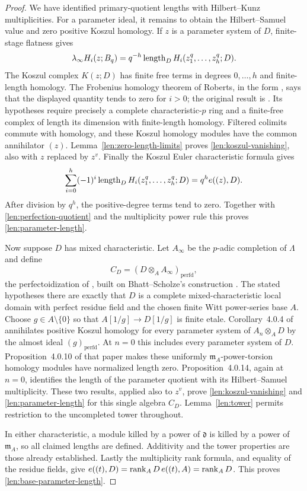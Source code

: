 \begin{proof}
We have identified primary-quotient lengths with Hilbert--Kunz
multiplicities.  For a parameter ideal, it remains to obtain the
Hilbert--Samuel value and zero positive Koszul homology.  If $z$ is
a parameter system of $D$, finite-stage flatness gives
\[
 \lambda_\infty H_i(z;B_q)
          =q^{-h}\operatorname{length}_D H_i(z_1^q,\ldots,z_h^q;D).
\]
The Koszul complex $K(z;D)$ has finite free terms in degrees
$0,\ldots,h$ and finite-length homology.  The Frobenius homology
theorem of Roberts, in the form \cite[Theorem~2.4]{Ma}, says that
the displayed quantity tends to zero for $i>0$; the original result
is \cite{RobertsIntersectionTheorems}. Its hypotheses
require precisely a complete characteristic-$p$ ring and a
finite-free complex of length its dimension with finite-length
homology.  Filtered colimits commute with homology, and these
Koszul homology modules have the common annihilator $(z)$.
Lemma~\ref{len:zero-length-limits} proves
\eqref{len:koszul-vanishing}, also with $z$ replaced by $z^v$.
Finally the Koszul Euler characteristic formula gives
\[
 \sum_{i=0}^h(-1)^i\operatorname{length}_D H_i(z_1^q,\ldots,z_h^q;D)
                           =q^h e((z),D).
\]
After division by $q^h$, the positive-degree terms tend to zero.
Together with \eqref{len:perfection-quotient} and the multiplicity
power rule this proves \eqref{len:parameter-length}.

Now suppose $D$ has mixed characteristic.  Let $A_\infty$ be the
$p$-adic completion of $\Lambda$ and define
\[
 C_D=(D\otimes_A A_\infty)_{\mathrm{perfd}},
\]
the perfectoidization of \cite[Notation~4.0.1]{CLMST}, built on
Bhatt--Scholze's construction \cite[Proposition~8.5]{BhattScholze}.
The stated hypotheses there are exactly that $D$ is a complete
mixed-characteristic local domain with perfect residue field and
the chosen finite Witt power-series base $A$.
Choose $g\in A\setminus\{0\}$ so that $A[1/g]\to D[1/g]$ is
finite etale.  Corollary~4.0.4 of \cite{CLMST} annihilates positive
Koszul homology for every parameter system of $A_n\otimes_A D$
by the almost ideal $(g)_{\mathrm{perfd}}$.
At $n=0$ this includes every parameter system of $D$.
Proposition~4.0.10 of that paper makes these uniformly
$\mathfrak m_A$-power-torsion homology modules have normalized
length zero.  Proposition~4.0.14, again at $n=0$, identifies the
length of the parameter quotient with its Hilbert--Samuel
multiplicity.  These two results, applied also to $z^v$, prove
\eqref{len:koszul-vanishing} and \eqref{len:parameter-length}
for this single algebra $C_D$.  Lemma~\ref{len:tower} permits
restriction to the uncompleted tower throughout.

In either characteristic, a module killed by a power of
$\mathfrak d$ is killed by a power of $\mathfrak m_A$, so all
claimed lengths are defined.  Additivity and the tower properties
are those already established.  Lastly the multiplicity rank formula,
and equality of the residue fields, give
$e((t),D)=\operatorname{rank}_A D\,e((t),A)=\operatorname{rank}_A D$.
This proves \eqref{len:base-parameter-length}.
\end{proof}

